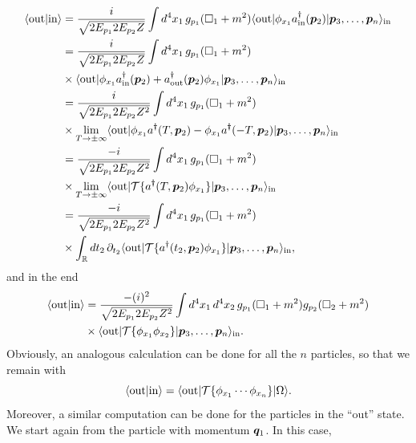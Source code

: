 \begin{equation}
    \begin{split}
        \langle \mathrm{out} | \mathrm{in} \rangle &= \frac{i}{\sqrt{2E_{p_1}2E_{p_2}Z}}\int d^4x_1\,g_{p_1}(\square_1 + m^2)\langle \mathrm{out} | \phi_{x_1}a^\dagger_{\mathrm{in}}(\bm{p}_2) | \bm{p}_3,\dots,\bm{p}_n \rangle_{\mathrm{in}} \\
        &= \frac{i}{\sqrt{2E_{p_1}2E_{p_2}Z}}\int d^4x_1\,g_{p_1}(\square_1 + m^2) \\
        &\times \langle \mathrm{out} | \phi_{x_1}a^\dagger_{\mathrm{in}}(\bm{p}_2) + a^\dagger_{\mathrm{out}}(\bm{p}_2)\phi_{x_1} | \bm{p}_3,\dots,\bm{p}_n \rangle_{\mathrm{in}} \\
        &= \frac{i}{\sqrt{2E_{p_1}2E_{p_2}Z^2}}\int d^4x_1\,g_{p_1}(\square_1 + m^2) \\
        &\times \lim_{T \to \pm\infty}\langle \mathrm{out} | \phi_{x_1}a^\dagger(T,\bm{p}_2) - \phi_{x_1}a^\dagger(-T,\bm{p}_2) | \bm{p}_3,\dots,\bm{p}_n \rangle_{\mathrm{in}} \\
        &= \frac{-i}{\sqrt{2E_{p_1}2E_{p_2}Z^2}}\int d^4x_1\,g_{p_1}(\square_1 + m^2) \\
        &\times \lim_{T \to \pm\infty}\langle \mathrm{out} | \mathcal{T}{\{a^\dagger(T,\bm{p}_2)\phi_{x_1}\}} | \bm{p}_3,\dots,\bm{p}_n \rangle_{\mathrm{in}} \\
        &= \frac{-i}{\sqrt{2E_{p_1}2E_{p_2}Z^2}}\int d^4x_1\,g_{p_1}(\square_1 + m^2) \\
        &\times \int_{\mathbb{R}} dt_2\,\partial_{t_2}\langle \mathrm{out} | \mathcal{T}{\{a^\dagger(t_2,\bm{p}_2)\phi_{x_1}\}} | \bm{p}_3,\dots,\bm{p}_n \rangle_{\mathrm{in}},
    \end{split}
\end{equation}
and in the end 
\begin{equation}
    \begin{split}
        \langle \mathrm{out} | \mathrm{in} \rangle &= \frac{-(i)^2}{\sqrt{2E_{p_1}2E_{p_2}Z^2}}\int d^4x_1\,d^4x_2\,g_{p_1}(\square_1 + m^2)g_{p_2}(\square_2 + m^2) \\
        &\times \langle \mathrm{out} | \mathcal{T}{\{\phi_{x_1}\phi_{x_2}\}} | \bm{p}_3,\dots,\bm{p}_n \rangle_{\mathrm{in}}.
    \end{split}
\end{equation}
Obviously, an analogous calculation can be done for all the $n$ particles, so that we remain with 
\begin{equation}
    \langle \mathrm{out} | \mathrm{in} \rangle = \langle \mathrm{out} | \mathcal{T}{\{\phi_{x_1}\cdots\phi_{x_n}\}} | \Omega \rangle.
\end{equation}
Moreover, a similar computation can be done for the particles in the ``out'' state. We start again from the particle with momentum $\bm{q}_1$. In this case, 
